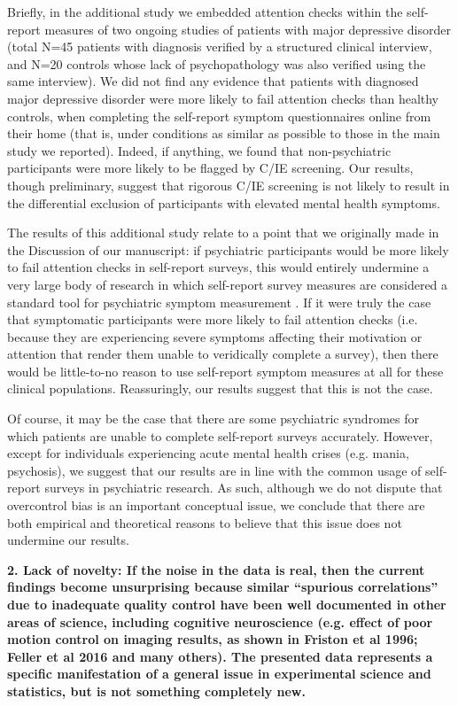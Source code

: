\documentclass[a4paper,notitlepage,12pt]{article}
\begin{document}
Briefly, in the additional study we embedded attention checks within the self-report measures of two ongoing studies of patients with major depressive disorder (total N=45 patients with diagnosis verified by a structured clinical interview, and N=20 controls whose lack of psychopathology was also verified using the same interview). We did not find any evidence that patients with diagnosed major depressive disorder were more likely to fail attention checks than healthy controls, when completing the self-report symptom questionnaires online from their home (that is, under conditions as similar as possible to those in the main study we reported). Indeed, if anything, we found that non-psychiatric participants were more likely to be flagged by C/IE screening. Our results, though preliminary, suggest that rigorous C/IE screening is not likely to result in the differential exclusion of participants with elevated mental health symptoms.

The results of this additional study relate to a point that we originally made in the Discussion of our manuscript: if psychiatric participants would be more likely to fail attention checks in self-report surveys, this would entirely undermine a very large body of research in which self-report survey measures are considered a standard tool for psychiatric symptom measurement \cite{Demetriou2015-bq}. If it were truly the case that symptomatic participants were more likely to fail attention checks (i.e. because they are experiencing severe symptoms affecting their motivation or attention that render them unable to veridically complete a survey), then there would be little-to-no reason to use self-report symptom measures at all for these clinical populations. Reassuringly, our results suggest that this is not the case.

Of course, it may be the case that there are some psychiatric syndromes for which patients are unable to complete self-report surveys accurately. However, except for individuals experiencing acute mental health crises (e.g. mania, psychosis), we suggest that our results are in line with the common usage of self-report surveys in psychiatric research. As such, although we do not dispute that overcontrol bias is an important conceptual issue, we conclude that there are both empirical and theoretical reasons to believe that this issue does not undermine our results.

\textbf{2. Lack of novelty: If the noise in the data is real, then the current findings become unsurprising because similar ``spurious correlations'' due to inadequate quality control have been well documented in other areas of science, including cognitive neuroscience (e.g. effect of poor motion control on imaging results, as shown in Friston et al 1996; Feller et al 2016 and many others). The presented data represents a specific manifestation of a general issue in experimental science and statistics, but is not something completely new.}
\end{document}

